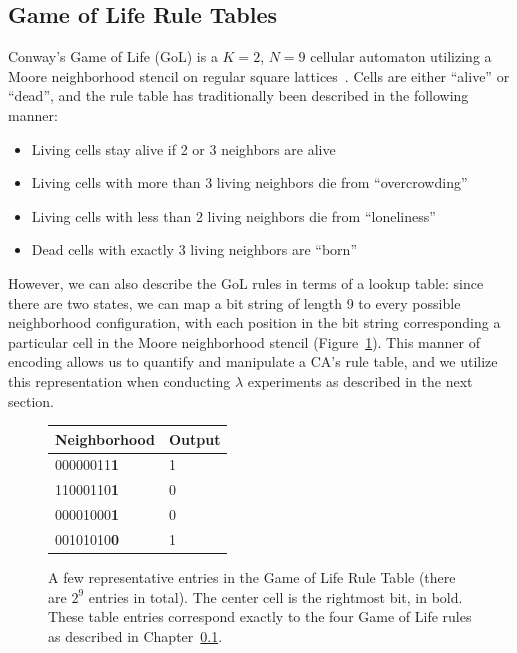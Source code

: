\documentclass[a4paper,11pt]{report}
\begin{document}
\subsection{Game of Life Rule Tables}
\label{ch3:subsec_gol}
Conway's Game of Life (GoL) is a $K=2$, $N=9$ cellular automaton utilizing a Moore neighborhood stencil on regular square lattices~\cite{ga70}. Cells are either ``alive'' or ``dead'', and the rule table has traditionally been described in the following manner:

\begin{itemize}
\item Living cells stay alive if 2 or 3 neighbors are alive
\item Living cells with more than 3 living neighbors die from ``overcrowding''
\item Living cells with less than 2 living neighbors die from ``loneliness''
\item Dead cells with exactly 3 living neighbors are ``born''
\end{itemize}

However, we can also describe the GoL rules in terms of a lookup table: since there are two states, we can map a bit string of length 9 to every possible neighborhood configuration, with each position in the bit string corresponding a particular cell in the Moore neighborhood stencil (Figure~\ref{fig:gol_table}). This manner of encoding allows us to quantify and manipulate a CA's rule table, and we utilize this representation when conducting $\lambda$ experiments as described in the next section.

\begin{figure}[htp]
\centering
\begin{tabular}{| l | l |}
\hline
Neighborhood & Output \\
\hline
00000011\textbf{1} & 1 \\
\hline
11000110\textbf{1} & 0 \\
\hline
00001000\textbf{1} & 0 \\
\hline
00101010\textbf{0} & 1 \\
\hline
\end{tabular}
\caption[Game of Life Rule Table]{
	A few representative entries in the Game of Life Rule Table (there are $2^9$ entries in total). The center cell is the rightmost bit, in bold. These table entries correspond exactly to the four Game of Life rules as described in Chapter~\ref{ch3:subsec_gol}.
}
\label{fig:gol_table}
\end{figure}
\end{document}
